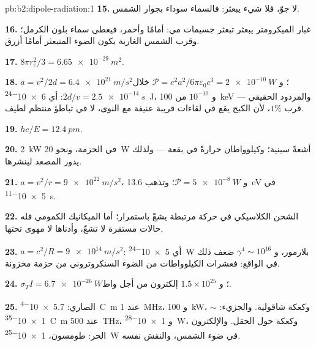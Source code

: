 \begin{solution}{pb:b2:dipole-radiation:1}
\textbf{15.} لا جوّ، فلا شيء يبعثر: فالسماء سوداء بجوار
الشمس.

\textbf{16.} غبار الميكرومتر يبعثر تبعثر جسيمات مي: أمامًا
وأحمر، فيعطي سماء بلون الكرمل؛ وقرب الشمس الغاربة يكون
الضوء المتبعثر أمامًا أزرق.

\textbf{17.} $8\pi r_e^2/3 = \qty{6.65e-29}{m^2}$.

\textbf{18.} $a = v^2/2d = \qty{6.4e21}{m/s^2}$؛ و $\mathcal P = e^2a^2/6\pi\varepsilon_0c^3 =
\qty{2e-10}{W}$ خلال $2d/v = \qty{2.5e-14}{s}$: أي \qty{6e-24}{J}، و $10^{-10}$ من
\qty{100}{keV} --- والمردود الحقيقي قرب $1\%$، لأن الكبح يقع
في لقاءات قريبة عنيفة مع النوى، لا في تباطؤ منتظم
لطيف.

\textbf{19.} $hc/E = \qty{12.4}{pm}$.

\textbf{20.} \qty{2}{kW} في الحزمة، ونحو \qty{20}{W} أشعةً سينية؛ وكيلوواطان
حرارةً في بقعة --- ولذلك يدور المصعد لينشرها.

\textbf{21.} $a = v^2/r = \qty{9e22}{m/s^2}$، و $\mathcal P = \qty{5e-8}{W}$؛ وتذهب \qty{13.6}{eV}
في \qty{5e-11}{s}.

\textbf{22.} الشحن الكلاسيكي في حركة مرتبطة يشعّ باستمرار؛
أما الميكانيك الكمومي فله حالات مستقرة لا تشعّ، وأدناها
لا مهوى تحتها.

\textbf{23.} $a = c^2/R = \qty{9e14}{m/s^2}$: أي \qty{5e-24}{W} بلارمور، و $\gamma^4 \sim 10^{16}$
ضعف ذلك في الواقع: فعشرات الكيلوواطات من الضوء السنكروتروني من
حزمة مخزونة.

\textbf{24.} $\sigma_TI = \qty{6.7e-26}{W}$؛ و $1.5 \times 10^{25}$ إلكترون من أجل واط.

\textbf{25.} الصاري: \qty{5.7e-4}{C.m} عند \qty{1}{MHz}، و \qty{100}{kW}، وكعكة
شاقولية. والجزيء: $\sim$\qty{1e-35}{C.m} عند \qty{500}{THz}، و \qty{1e-28}{W}،
وكعكة حول الحقل. والإلكترون الحر: طومسون، \qty{1e-25}{W} في
ضوء الشمس، والنقش نفسه.
\end{solution}
